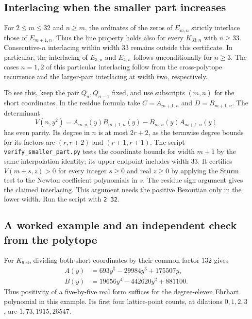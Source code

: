\subsection*{Interlacing when the smaller part increases}
For $2\le m\le32$ and $n\ge m$, the ordinates of the zeros of
$E_{m,n}$ strictly interlace those of $E_{m+1,n}$. Thus the line
property holds also for every $K_{33,n}$ with $n\ge33$. Consecutive-$n$
interlacing within width $33$ remains outside this certificate.
In particular, the interlacing of $E_{3,n}$ and $E_{4,n}$ follows
unconditionally for $n\ge3$. The cases $n=1,2$ of this particular
interlacing follow from the cross-polytope recurrence and the
larger-part interlacing at width two, respectively.

To see this, keep the pair $Q_n,Q_{n-1}$ fixed, and use subscripts
$(m,n)$ for the short coordinates. In the residue formula take
$C=A_{m+1,n}$ and $D=B_{m+1,n}$. The determinant
\[
 V(n,y^2)=A_{m,n}(y) B_{m+1,n}(y)-B_{m,n}(y) A_{m+1,n}(y)
\]
has even parity. Its degree in $n$ is at most $2r+2$, as the termwise
degree bounds for its factors are $(r,r+2)$ and $(r+1,r+1)$.
The script \texttt{verify\_smaller\_part.py} tests the coordinate bounds
for width $m+1$ by the same interpolation identity; its upper endpoint
includes width $33$. It certifies $V(m+s,z)>0$ for every integer
$s\ge0$ and real $z\ge0$ by applying the Sturm test to the Newton
coefficient polynomials in $s$. The residue sign argument gives the
claimed interlacing. This argument needs the positive Bezoutian only
in the lower width. Run the script with \texttt{2 32}.

\subsection*{A worked example and an independent check from the polytope}
For $K_{6,6}$, dividing both short coordinates by their common factor $132$ gives
\[
 \begin{aligned}
 A(y)&=693y^5-29984y^3+175507y,\\
 B(y)&=19656y^4-442620y^2+881100 .
 \end{aligned}
\]
Thus positivity of a five-by-five real form suffices for the degree-eleven Ehrhart polynomial in this example. Its first four lattice-point counts, at dilations $0,1,2,3$, are $1,73,1915,26547$.

